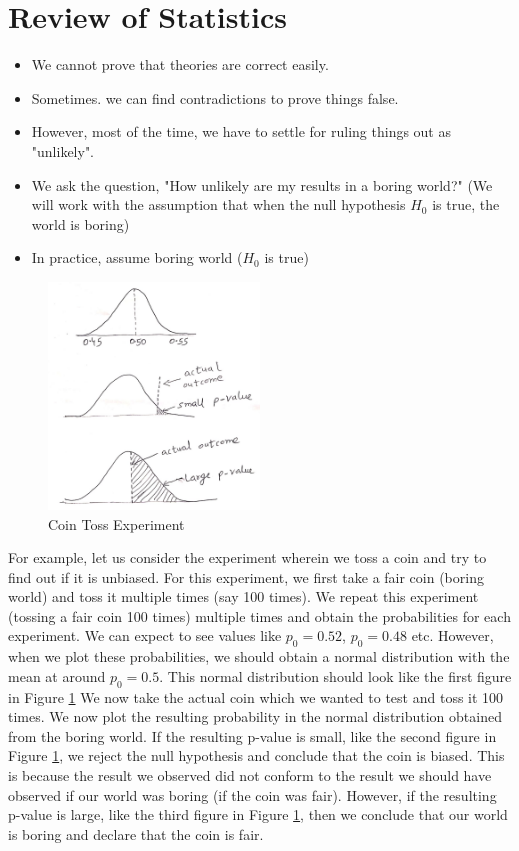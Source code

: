 \section{Review of Statistics}
\begin{itemize}
    \item We cannot prove that theories are correct easily.
    \item Sometimes. we can find contradictions to prove things false.
    \item However, most of the time, we have to settle for ruling things out as "unlikely".
    \item We ask the question, "How unlikely are my results in a boring world?" (We will work with the assumption that when the null hypothesis $H_0$ is true, the world is boring)
    \item In practice, assume boring world ($H_0$ is true)
\end{itemize}
\begin{figure}[ht]
  \begin{center}
    \includegraphics[width=0.5\textwidth,scale=2.0]{figures/pvalue.jpeg}
    \caption{
      Coin Toss Experiment}
    \label{fig:pvalue}
  \end{center}
\end{figure}
For example, let us consider the experiment wherein we toss a coin and try to find out if it is unbiased. For this experiment, we first take a fair coin (boring world) and toss it multiple times (say 100 times). We repeat this experiment (tossing a fair coin 100 times) multiple times and obtain the probabilities for each experiment. We can expect to see values like $p_0 = 0.52$, $p_0 = 0.48$ etc. However, when we plot these probabilities, we should obtain a normal distribution with the mean at around $p_0 = 0.5$. This normal distribution should look like the first figure in Figure \ref{fig:pvalue} We now take the actual coin which we wanted to test and toss it 100 times. We now plot the resulting probability in the normal distribution obtained from the boring world. If the resulting p-value is small, like the second figure in Figure \ref{fig:pvalue}, we reject the null hypothesis and conclude that the coin is biased. This is because the result we observed did not conform to the result we should have observed if our world was boring (if the coin was fair). However, if the resulting p-value is large, like the third figure in Figure \ref{fig:pvalue}, then we conclude that our world is boring and declare that the coin is fair. \\
